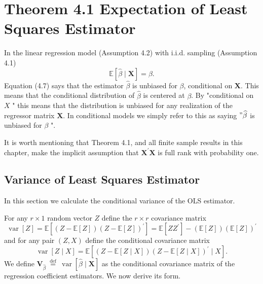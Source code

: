 \documentclass[10pt]{article}
\begin{document}
\section{Theorem 4.1 Expectation of Least Squares Estimator}
In the linear regression model (Assumption 4.2) with i.i.d. sampling (Assumption 4.1)
$$
\mathbb{E}[\widehat{\beta} \mid \boldsymbol{X}]=\beta .
$$
Equation (4.7) says that the estimator $\widehat{\beta}$ is unbiased for $\beta$, conditional on $\boldsymbol{X}$. This means that the conditional distribution of $\widehat{\beta}$ is centered at $\beta$. By "conditional on $X$ " this means that the distribution is unbiased for any realization of the regressor matrix $\boldsymbol{X}$. In conditional models we simply refer to this as saying $" \widehat{\beta}$ is unbiased for $\beta$ ".

It is worth mentioning that Theorem 4.1, and all finite sample results in this chapter, make the implicit assumption that $\boldsymbol{X}^{\prime} \boldsymbol{X}$ is full rank with probability one.

\subsection{Variance of Least Squares Estimator}
In this section we calculate the conditional variance of the OLS estimator.

For any $r \times 1$ random vector $Z$ define the $r \times r$ covariance matrix
$$
\operatorname{var}[Z]=\mathbb{E}\left[(Z-\mathbb{E}[Z])(Z-\mathbb{E}[Z])^{\prime}\right]=\mathbb{E}\left[Z Z^{\prime}\right]-(\mathbb{E}[Z])(\mathbb{E}[Z])^{\prime}
$$
and for any pair $(Z, X)$ define the conditional covariance matrix
$$
\operatorname{var}[Z \mid X]=\mathbb{E}\left[(Z-\mathbb{E}[Z \mid X])(Z-\mathbb{E}[Z \mid X])^{\prime} \mid X\right] .
$$
We define $\boldsymbol{V}_{\widehat{\beta}} \stackrel{\text { def }}{=} \operatorname{var}[\widehat{\beta} \mid \boldsymbol{X}]$ as the conditional covariance matrix of the regression coefficient estimators. We now derive its form.
\end{document}
